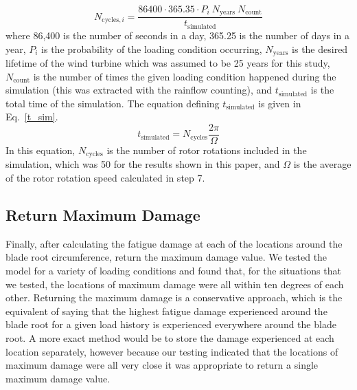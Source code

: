 \documentclass[11pt,letterpaper]{article}
\begin{document}
% 
\begin{equation}
    N_{\text{cycles},i} = \frac{86400 \cdot 365.35 \cdot P_i ~ N_{\text{years}}~ N_{\text{count}}}{t_{\text{simulated}}}
    \label{ncycles}
\end{equation}
% 
where 86,400 is the number of seconds in a day, 365.25 is the number of days in a year, $P_i$ is the probability of the loading condition occurring, $N_{\text{years}}$ is the desired lifetime of the wind turbine which was assumed to be 25 years for this study, $N_{\text{count}}$ is the number of times the given loading condition happened during the simulation (this was extracted with the rainflow counting), and $t_{\text{simulated}}$ is the total time of the simulation. The equation defining $t_{\text{simulated}}$ is given in Eq.~\ref{t_sim}.
% 
\begin{equation}
    t_{\text{simulated}} = N_{\text{cycles}} \frac{2\pi}{\Omega}
    \label{t_sim}
\end{equation}
% 
In this equation, $N_{\text{cycles}}$ is the number of rotor rotations included in the simulation, which was 50 for the results shown in this paper, and $\Omega$ is the average of the rotor rotation speed calculated in step 7. 
                


\subsection{Return Maximum Damage}

Finally, after calculating the fatigue damage at each of the locations around the blade root circumference, return the maximum damage value. 
We tested the model for a variety of loading conditions and found that, for the situations that we tested, the locations of maximum damage were all within ten degrees of each other.
Returning the maximum damage is a conservative approach, which is the equivalent of saying that the highest fatigue damage experienced around the blade root for a given load history is experienced everywhere around the blade root. 
A more exact method would be to store the damage experienced at each location separately, however because our testing indicated that the locations of maximum damage were all very close it was appropriate to return a single maximum damage value.
\end{document}
